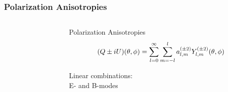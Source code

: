 \documentclass[10pt,aspectratio=169]{beamer}
\begin{document}
\begin{frame}
\frametitle{Polarization Anisotropies}

\begin{columns}
        \begin{column}{0.60\textwidth}
                \centering
        \end{column}
        \pause
        \begin{column}{0.38\textwidth}
        \scriptsize
                \begin{block}{Polarization Anisotropies}
                        \tiny
                        \begin{equation}
                                (Q \pm iU)\qty(\theta,\phi) =
                                \sum^\infty_{l=0}\sum^l_{m=-l}
                                a^{\qty(\pm 2)}_{l,m}
                                Y^{\qty(\pm 2)}_{l,m}\qty(\theta,\phi)
                        \end{equation}
                \end{block}
                \pause
                \begin{tcolorbox}
                        Linear combinations:\\
                        \large \alert{E-} and \alert{B-modes}
                \end{tcolorbox}
        \end{column}
\end{columns}

\end{frame}
\end{document}
